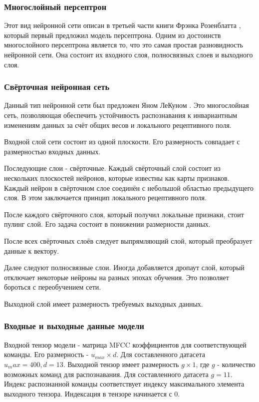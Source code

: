 \subsubsection{Многослойный персептрон}
Этот вид нейронной сети описан в третьей части книги Фрэнка Розенблатта \cite{Perceptron}, который первый предложил модель персептрона. Одним из достоинств многослойного персептрона является то, что это самая простая разновидность нейронной сети. Она состоит их входного слоя, полносвязных слоев и выходного слоя.
\subsubsection{Свёрточная нейронная сеть}
Данный тип нейронной сети был предложен Яном ЛеКуном \cite{CNN}. Это многослойная сеть, позволяющая обеспечить устойчивость распознавания к инвариантным изменениям данных за счёт общих весов и локального рецептивного поля.

Входной слой сети состоит из одной плоскости. Его размерность совпадает с размерностью входных данных. 

Последующие слои - свёрточные. Каждый свёрточный слой состоит из нескольких плоскостей нейронов, которые известны как карты признаков. Каждый нейрон в свёрточном слое соединён с небольшой областью предыдущего слоя. В этом заключается принцип локального рецептивного поля.

После каждого свёрточного слоя, который получил локальные признаки, стоит пулинг слой. Его задача состоит в понижении размерности данных.

После всех свёрточных слоёв следует выпрямляющий слой, который преобразует данные к вектору. 

Далее следуют полносвязные слои. Иногда добавляется дропаут слой, который отключает некоторые нейроны на разных эпохах обучения. Это позволяет бороться с переобучением сети.

Выходной слой имеет размерность требуемых выходных данных. 

\subsubsection{Входные и выходные данные модели}
Входной тензор модели - матрица MFCC коэффициентов для соответствующей команды. Его размерность - $u_{max} \times d$. Для составленного датасета $u_max=400, d=13$.
Выходной тензор имеет размерность $g \times 1$, где $g$ - количество возможных команд для распознавания. Для составленного датасета $g=11$. Индекс распознанной команды соответствует индексу максимального элемента выходного тензора. Индексация в тензоре начинается с 0.
